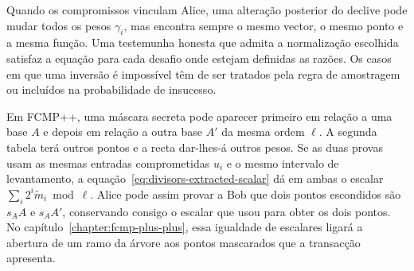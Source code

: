 Quando os compromissos vinculam Alice, uma alteração posterior do
declive pode mudar todos os pesos \(\gamma_i\), mas encontra sempre
o mesmo vector, o mesmo ponto e a mesma função. Uma testemunha
honesta que admita a normalização escolhida satisfaz a equação para
cada desafio onde estejam definidas as razões. Os casos em que uma
inversão é impossível têm de ser tratados pela regra de amostragem
ou incluídos na probabilidade de insucesso.

Em FCMP++, uma máscara secreta pode aparecer primeiro em relação a
uma base \(A\) e depois em relação a outra base \(A'\) da mesma
ordem \(\ell\). A segunda tabela terá outros pontos e a recta
dar-lhes-á outros pesos. Se as duas provas usam as mesmas entradas
comprometidas \(u_i\) e o mesmo intervalo de levantamento, a
equação~\eqref{eq:divisors-extracted-scalar} dá em ambas o escalar
\(\sum_i2^i\widetilde m_i\bmod\ell\). Alice pode assim provar a
Bob que dois pontos escondidos são \(s_AA\) e \(s_AA'\), conservando
consigo o escalar que usou para obter os dois pontos. No
capítulo~\ref{chapter:fcmp-plus-plus}, essa igualdade de escalares ligará
a abertura de um ramo da árvore aos pontos mascarados que a transacção
apresenta.\hypertarget{excerto.divisores.fim}{}
